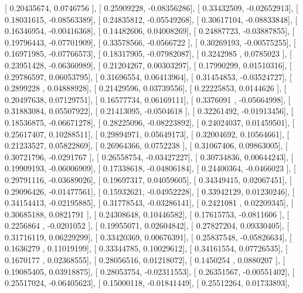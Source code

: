 \documentclass{article}
\begin{document}
       [ 0.20435674,  0.0746756 ],
       [ 0.25909228, -0.08356286],
       [ 0.33432509, -0.02652913],
       [ 0.18031615, -0.08563389],
       [ 0.24835812, -0.05549268],
       [ 0.30617104, -0.08833848],
       [ 0.16346954, -0.00416368],
       [ 0.14482606,  0.04008269],
       [ 0.24887723, -0.03887855],
       [ 0.19796443, -0.07701909],
       [ 0.33578566, -0.0566722 ],
       [ 0.30269193, -0.00575255],
       [ 0.16971985, -0.07766573],
       [ 0.18317905, -0.07982087],
       [ 0.3242985 ,  0.0785023 ],
       [ 0.23951428, -0.06360989],
       [ 0.21204267,  0.00303297],
       [ 0.17990299,  0.01510316],
       [ 0.29786597,  0.06053795],
       [ 0.31696554,  0.06413964],
       [ 0.31454853, -0.03524727],
       [ 0.2899228 ,  0.04888928],
       [ 0.21429596,  0.03739556],
       [ 0.22225853,  0.0144626 ],
       [ 0.20497638,  0.07129751],
       [ 0.16577734,  0.06169111],
       [ 0.3376091 , -0.05664998],
       [ 0.31883084,  0.05507922],
       [ 0.21413095, -0.0504618 ],
       [ 0.32261492, -0.01913456],
       [ 0.18536875, -0.06671278],
       [ 0.28225096, -0.08223892],
       [ 0.24024037,  0.01459501],
       [ 0.25617407,  0.10288511],
       [ 0.29894971,  0.05649173],
       [ 0.32004692,  0.10564661],
       [ 0.21233527,  0.05822869],
       [ 0.26964366,  0.0752238 ],
       [ 0.31067406,  0.09863005],
       [ 0.30721796, -0.0291767 ],
       [ 0.26558754, -0.03427227],
       [ 0.30734836,  0.00644243],
       [ 0.19909193, -0.06006909],
       [ 0.17338618, -0.04806184],
       [ 0.24400364, -0.0466023 ],
       [ 0.29791116, -0.03689026],
       [ 0.19697317,  0.04059605],
       [ 0.34349415,  0.02067451],
       [ 0.29096426, -0.01477561],
       [ 0.15932621, -0.04952228],
       [ 0.33942129,  0.01230246],
       [ 0.34154413, -0.02195885],
       [ 0.31778543, -0.03286141],
       [ 0.2421081 ,  0.02209345],
       [ 0.30685188,  0.0821791 ],
       [ 0.24308648,  0.10446582],
       [ 0.17615753, -0.0811606 ],
       [ 0.2256864 , -0.0201052 ],
       [ 0.19955071,  0.02604842],
       [ 0.27827204,  0.09330405],
       [ 0.31716119,  0.06229299],
       [ 0.33420369,  0.00676391],
       [ 0.25837548, -0.05826634],
       [ 0.1636279 ,  0.11019199],
       [ 0.33344785,  0.10029612],
       [ 0.34161554,  0.07726535],
       [ 0.1670177 ,  0.02368555],
       [ 0.28056516,  0.01218072],
       [ 0.1450254 ,  0.0880207 ],
       [ 0.19085405,  0.03918875],
       [ 0.28053754, -0.02311553],
       [ 0.26351567, -0.00551402],
       [ 0.25517024, -0.06405623],
       [ 0.15000118, -0.01841449],
       [ 0.25512264,  0.01733893],
\end{document}
